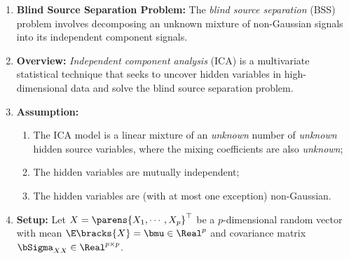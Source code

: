 \documentclass[12pt]{article}
\begin{document}
\begin{enumerate}[label=\textbf{\arabic*.}]

	\item \textbf{Blind Source Separation Problem:} The \textit{blind source separation} (BSS) problem involves decomposing an unknown mixture of non-Gaussian signals into its independent component signals. 
	
	\item \textbf{Overview:} \textit{Independent component analysis} (ICA) is a multivariate statistical technique that seeks to uncover hidden variables in high-dimensional data and solve the blind source separation problem. 
	
	\item \textbf{Assumption:} 
	\begin{enumerate}
		\item The ICA model is a linear mixture of an \emph{unknown} number of \emph{unknown} hidden source variables, where the mixing coefficients are also \emph{unknown}; 
		\item The hidden variables are mutually independent; 
		\item The hidden variables are (with at most one exception) non-Gaussian. 
	\end{enumerate}
	
	\item \textbf{Setup:} Let $X = \parens{X_1, \cdots, X_p}^\top$ be a $p$-dimensional random vector with mean $\E \bracks{X} = \bmu \in \Real^p$ and covariance matrix $\bSigma_{XX} \in \Real^{p \times p}$. 
	

\end{enumerate}
\end{document}
